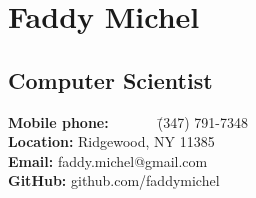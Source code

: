 \section{Faddy Michel}
\subsection{Computer Scientist}

\begin{tabbing}
 \textbf{Mobile phone:}\ \ \ \ \ \ \ \= (347) 791-7348\\
 \textbf{Location:} \> Ridgewood, NY 11385\\
 \textbf{Email:} \> faddy.michel@gmail.com\\
 \textbf{GitHub:} \> github.com/faddymichel
\end{tabbing}

